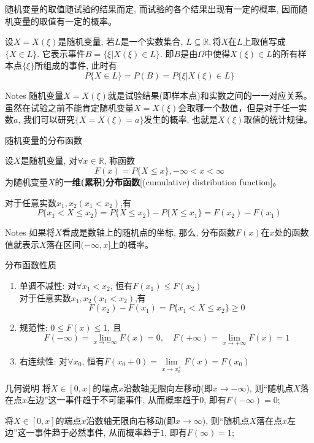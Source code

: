 \begin{frame}
随机变量的取值随试验的结果而定, 而试验的各个结果出现有一定的概率, 因而随机变量的取值有一定的概率。
\begin{definition}
	设$X=X(\xi)$是随机变量, 若$L$是一个实数集合, $L\subseteq\mathbb{R}, $将$X$在$L$上取值写成$\{X\in L\}$. 它表示事件$B=\{\xi|X(\xi)\in L \}$. 即$B$是由$\Omega$中使得$X(\xi)\in L$的所有样本点$\{\xi\}$所组成的事件, 此时有
    \[P\{X\in L\}=P(B)=P\{\xi|X(\xi)\in L\} \]
\end{definition}
\begin{block}{Notes}
	随机变量$X=X(\xi)$就是试验结果(即样本点)和实数之间的一一对应关系。虽然在试验之前不能肯定随机变量$X=X(\xi)$会取哪一个数值，但是对于任一实数$a$, 我们可以研究$\{X=X(\xi)=a \}$发生的概率, 也就是$X(\xi)$取值的统计规律。
\end{block}
\end{frame}

\begin{frame}{随机变量的分布函数}
\begin{definition}
	设$X$是随机变量, 对$\forall x\in\mathbb{R}$, 称函数
	\[F(x)=P\{X\le x\}, -\infty<x<\infty\]
	为随机变量$X$的\textbf{一维(累积)分布函数}[(cumulative) distribution function]。
\end{definition}
对于任意实数$x_1,x_2(x_1<x_2)$,有
\[P\{x_1<X\le x_2\}=P\{X\le x_2\}-P\{X\le x_1\}=F(x_2)-F(x_1) \]
\begin{block}{Notes}
	如果将$X$看成是数轴上的随机点的坐标, 那么, 分布函数$F(x)$在$x$处的函数值就表示$X$落在区间$(-\infty,x]$上的概率。
\end{block}
\end{frame}

\begin{frame}
\begin{block}{分布函数性质}
	\begin{enumerate}
		\item 单调不减性: 对$\forall x_1<x_2$, 恒有$F(x_1)\le F(x_2)$\\
		对于任意实数$x_1,x_2(x_1<x_2)$,有
		\[F(x_2)-F(x_1)=P\{x_1<X\le x_2\}\ge 0 \]
		\item 规范性: $0\le F(x)\le 1$, 且
		\[ F(-\infty)=\lim\limits_{x\to -\infty}F(x)=0,\quad F(+\infty)=\lim\limits_{x\to +\infty}F(x)=1 \]
		\item 右连续性: 对$\forall x_0$, 恒有$F(x_0+0)=\lim\limits_{x\to x_0^+}F(x)=F(x_0)$
	\end{enumerate}
\end{block}
\begin{block}{几何说明}
	将$X\in [0,x]$的端点$x$沿数轴无限向左移动(即$x\to -\infty$), 则``随机点$X$落在点$x$左边''这一事件趋于不可能事件, 从而概率趋于$0$, 即有$F(-\infty)=0$;
	
	\medskip
	将$X\in [0,x]$的端点$x$沿数轴无限向右移动(即$x\to \infty$), 则``随机点$X$落在点$x$左边''这一事件趋于必然事件, 从而概率趋于$1$, 即有$F(\infty)=1$;
\end{block}

\end{frame}

